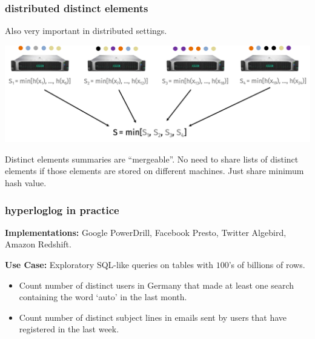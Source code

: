 \documentclass[compress]{beamer}
\begin{document}
\begin{frame}
	\frametitle{distributed distinct elements}
	Also very important in distributed settings. 
	\begin{center}
		\includegraphics[width=\textwidth]{dist_min_hash.png}
	\end{center}

	Distinct elements summaries are ``mergeable''. No need to share lists of distinct elements if those elements are stored on different machines. Just share minimum hash value.
\end{frame}

\begin{frame}
	\frametitle{hyperloglog in practice}
	\small
	\textbf{Implementations:} Google PowerDrill, Facebook Presto, Twitter Algebird, Amazon Redshift.
	
	\textbf{Use Case:} Exploratory SQL-like queries on tables with $100$'s of billions of rows.
	\begin{itemize}
		\item \alert{Count} number of \alert{distinct} users in Germany that  made at least one search containing the word `auto' in the last month.
		\item \alert{Count} number of \alert{distinct} subject lines in emails sent by users that have registered in the last week.
	\end{itemize}
\end{frame}
\end{document}
